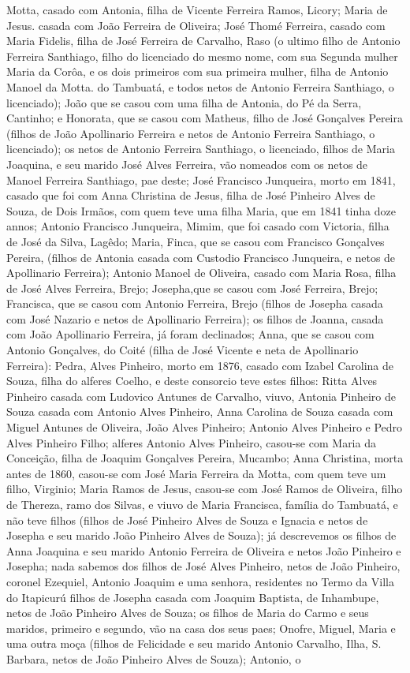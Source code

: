 Motta, casado com Antonia, filha de Vicente Ferreira Ramos, Licory; Maria de Jesus. casada com João Ferreira de Oliveira; José Thomé Ferreira, casado com Maria Fidelis, filha de José Ferreira de Carvalho, Raso (o ultimo filho de Antonio Ferreira Santhiago, filho do licenciado do mesmo nome, com sua Segunda mulher Maria da Corôa, e os dois primeiros com sua primeira mulher, filha de Antonio Manoel da Motta. do Tambuatá, e todos netos de Antonio Ferreira Santhiago, o licenciado); João que se casou com uma filha de Antonia, do Pé da Serra, Cantinho; e Honorata, que se casou com Matheus, filho de José Gonçalves Pereira (filhos de João Apollinario Ferreira e netos de Antonio Ferreira Santhiago, o licenciado); os netos de Antonio Ferreira Santhiago, o licenciado, filhos de Maria Joaquina, e seu marido José Alves Ferreira, vão nomeados com os netos de Manoel Ferreira Santhiago, pae deste; José Francisco Junqueira, morto em 1841, casado que foi com Anna Christina de Jesus, filha de José Pinheiro Alves de Souza, de Dois Irmãos, com quem teve uma filha Maria, que em 1841 tinha doze annos; Antonio Francisco Junqueira, Mimim, que foi casado com Victoria, filha de José da Silva, Lagêdo; Maria, Finca, que se casou com Francisco Gonçalves Pereira, (filhos de Antonia casada com Custodio Francisco Junqueira, e netos de Apollinario Ferreira); Antonio Manoel de Oliveira, casado com Maria Rosa, filha de José Alves Ferreira, Brejo; Josepha,que se casou com José Ferreira, Brejo; Francisca, que se casou com Antonio Ferreira, Brejo (filhos de Josepha casada com José Nazario e netos de Apollinario Ferreira); os filhos de Joanna, casada com João Apollinario Ferreira, já foram declinados; Anna, que se casou com Antonio Gonçalves, do Coité (filha de José Vicente e neta de Apollinario Ferreira): Pedra, Alves Pinheiro, morto em 1876, casado com Izabel Carolina de Souza, filha do alferes Coelho, e deste consorcio teve estes filhos: Ritta Alves Pinheiro casada com Ludovico Antunes de Carvalho, viuvo, Antonia Pinheiro de Souza casada com Antonio Alves Pinheiro, Anna Carolina de Souza casada com Miguel Antunes de Oliveira, João Alves Pinheiro; Antonio Alves Pinheiro e Pedro Alves Pinheiro Filho; alferes Antonio Alves Pinheiro, casou-se com Maria da Conceição, filha de Joaquim Gonçalves Pereira, Mucambo; Anna Christina, morta antes de 1860, casou-se com José Maria Ferreira da Motta, com quem teve um filho, Virginio; Maria Ramos de Jesus, casou-se com José Ramos de Oliveira, filho de Thereza, ramo dos Silvas, e viuvo de Maria Francisca, família do Tambuatá, e não teve filhos (filhos de José Pinheiro Alves de Souza e Ignacia e netos de Josepha e seu marido João Pinheiro Alves de Souza); já descrevemos os filhos de Anna Joaquina e seu marido Antonio Ferreira de Oliveira e netos João Pinheiro e Josepha; nada sabemos dos filhos de José Alves Pinheiro, netos de João Pinheiro, coronel Ezequiel, Antonio Joaquim e uma senhora, residentes no Termo da Villa do Itapicurú filhos de Josepha casada com Joaquim Baptista, de Inhambupe, netos de João Pinheiro Alves de Souza; os filhos de Maria do Carmo e seus maridos, primeiro e segundo, vão na casa dos seus paes; Onofre, Miguel, Maria e uma outra moça (filhos de Felicidade e seu marido Antonio Carvalho, Ilha, S. Barbara, netos de João Pinheiro Alves de Souza); Antonio, o 